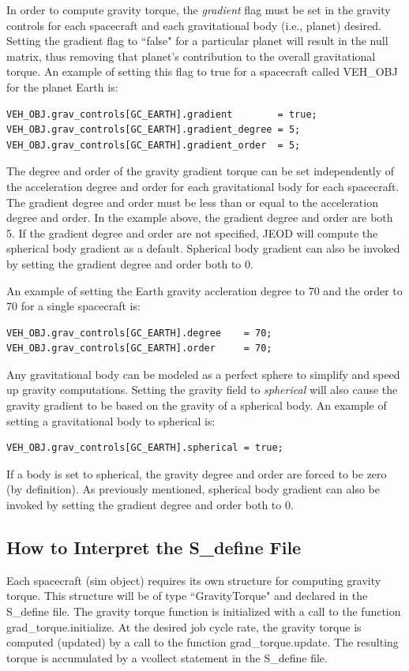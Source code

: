 In order to compute gravity torque, the {\it gradient} flag must be set in the
gravity controls for each spacecraft and each gravitational body (i.e., planet) desired.
Setting the gradient flag to ``false" for a particular planet will result in the 
null matrix, thus removing that planet's contribution to the overall
gravitational torque.  An example of setting this flag to true for a spacecraft 
called VEH\_OBJ for the planet Earth is:
\begin{verbatim}
VEH_OBJ.grav_controls[GC_EARTH].gradient        = true;
VEH_OBJ.grav_controls[GC_EARTH].gradient_degree = 5;
VEH_OBJ.grav_controls[GC_EARTH].gradient_order  = 5;
\end{verbatim}

The degree and order of the gravity gradient torque can be set independently
of the acceleration degree and order for each gravitational body for each
spacecraft. The gradient degree and order must be less
than or equal to the acceleration degree and order. 
In the example above, the 
gradient degree and order are both 5.
If the gradient degree and order are not specified,
JEOD will compute the spherical body gradient as a default.
Spherical body gradient can also be invoked by setting the gradient
degree and order both to 0. 

An example of setting the Earth gravity accleration degree to 70 and the
order to 70 for a single spacecraft is:
\begin{verbatim}
VEH_OBJ.grav_controls[GC_EARTH].degree    = 70;
VEH_OBJ.grav_controls[GC_EARTH].order     = 70;
\end{verbatim}

Any gravitational body can be modeled as a perfect sphere to simplify and
speed up gravity computations. Setting the gravity field to {\it spherical} will
also cause the gravity gradient to be based on the gravity of a spherical body.
An example of setting a gravitational body to spherical is:
\begin{verbatim}
VEH_OBJ.grav_controls[GC_EARTH].spherical = true;
\end{verbatim}
If a body is set to spherical, the gravity degree and order are forced to be
zero (by definition).  As previously mentioned, spherical body gradient can
also be invoked by setting the gradient degree and order both to 0.


\subsection{How to Interpret the S\_define File}
Each spacecraft (sim object) requires its own structure for computing gravity torque.  
This structure will be of type ``GravityTorque" and declared in the S\_define file. 
The gravity torque function is initialized with a call to the function grad\_torque.initialize.
At the desired job cycle rate, the gravity torque is computed (updated) by a call to the
function grad\_torque.update. The resulting torque is accumulated by a vcollect statement in 
the S\_define file. 

